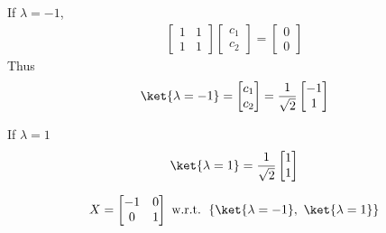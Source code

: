\documentclass[10pt]{book}
\begin{document}
	If $\lambda = -1$,
	\begin{equation}
\begin{aligned}
		\begin{bmatrix}
			1 & 1 \\
			1 & 1
		\end{bmatrix}
		\begin{bmatrix}
			c_1 \\
			c_2
		\end{bmatrix} =
		\begin{bmatrix}
			0 \\
			0
		\end{bmatrix}
	\end{aligned}
\end{equation}
	Thus
	\begin{equation}
\begin{aligned}
		\ket{\lambda = -1} = \begin{bmatrix}
			c_1 \\
			c_2
		\end{bmatrix} = \frac{1}{\sqrt{2}}
		\begin{bmatrix}
			-1 \\
			1
		\end{bmatrix}
	\end{aligned}
\end{equation}
	
	If $\lambda = 1$
	\begin{equation}
\begin{aligned}
		\ket{\lambda = 1} = \frac{1}{\sqrt{2}}
		\begin{bmatrix}
			1 \\
			1
		\end{bmatrix}
	\end{aligned}
\end{equation}
	
	\begin{equation}
\begin{aligned}
		X = \begin{bmatrix}
			-1 & 0 \\
			0 & 1
		\end{bmatrix}
		\text{ w.r.t. } \left\{ \ket{\lambda = -1},\ \ket{\lambda = 1}\right\}
	\end{aligned}
\end{equation}
	
	
	
\end{document}
